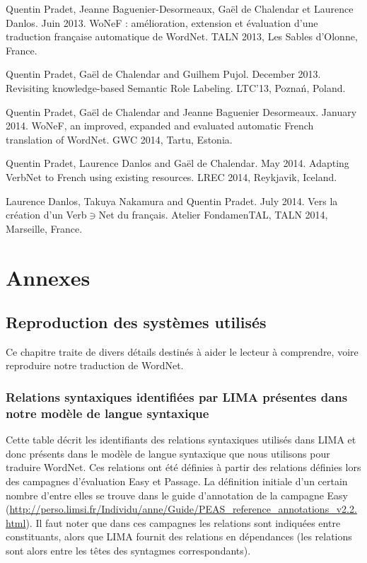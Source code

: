 \documentclass[oneside,parskip]{scrbook}
\begin{document}
Quentin Pradet, Jeanne Baguenier-Desormeaux, Gaël de Chalendar et Laurence Danlos. Juin 2013. WoNeF : amélioration, extension et évaluation d’une traduction française automatique de WordNet. TALN 2013, Les Sables d'Olonne, France.

Quentin Pradet, Gaël de Chalendar and Guilhem Pujol. December 2013. Revisiting knowledge-based Semantic Role Labeling. LTC'13, Poznań, Poland.

Quentin Pradet, Gaël de Chalendar and Jeanne Baguenier Desormeaux. January 2014. WoNeF, an improved, expanded and evaluated automatic French translation of WordNet. GWC 2014, Tartu, Estonia.

Quentin Pradet, Laurence Danlos and Gaël de Chalendar. May 2014. Adapting VerbNet to French using existing resources. LREC 2014, Reykjavik, Iceland.

Laurence Danlos, Takuya Nakamura and Quentin Pradet. July 2014. Vers la création d’un Verb$\ni$Net du français. Atelier FondamenTAL, TALN 2014, Marseille, France.



\part{Annexes}

\chapter{Reproduction des systèmes utilisés}

Ce chapitre traite de divers détails destinés à aider le lecteur à comprendre,
voire reproduire notre traduction de WordNet.

\section{Relations syntaxiques identifiées par LIMA présentes dans notre modèle
de langue syntaxique}
\label{relations_modele_langue}

Cette table décrit les identifiants des relations syntaxiques utilisés dans
LIMA et donc présents dans le modèle de langue syntaxique que nous utilisons
pour traduire WordNet. Ces relations ont été définies à partir des relations
définies lors des campagnes d'évaluation Easy et Passage. La définition
initiale d'un certain nombre d'entre elles se trouve dans le guide d'annotation
de la campagne Easy
(\url{http://perso.limsi.fr/Individu/anne/Guide/PEAS_reference_annotations_v2.2.html}).
Il faut noter que dans ces campagnes les relations sont indiquées entre
constituants, alors que LIMA fournit des relations en dépendances (les
relations sont alors entre les têtes des syntagmes correspondants).
\end{document}
